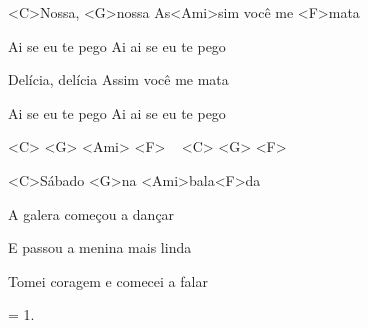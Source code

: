 
\zr

<C>Nossa, <G>nossa
As<Ami>sim você me <F>mata

Ai se eu te pego
Ai ai se eu te pego

Delícia, delícia
Assim você me mata

Ai se eu te pego
Ai ai se eu te pego
\kr


<C> <G> <Ami> <F> ~ <C> <G> <F>

\zs
<C>Sábado <G>na <Ami>bala<F>da

A galera começou a dançar

E passou a menina mais linda

Tomei coragem e comecei a falar
\ks

\zr \kr

\zs
= 1.
\ks

\zr \kr

\zr \kr

\kp
